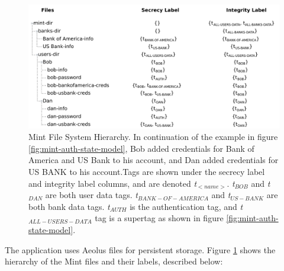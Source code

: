 \begin{figure}[h]
\centering
\includegraphics[width=\textwidth,height=\textheight,keepaspectratio]{figures/mint-filesystem}
\caption[Mint File System Hierarchy]{Mint File System Hierarchy. In continuation of the example in figure \ref{fig:mint-auth-state-model}, Bob added credentials for Bank of America and US Bank to his account, and Dan added credentials for US BANK to his account.Tags are shown under the secrecy label and integrity label columns, and are denoted \emph{t$_{<name>}$}. \emph{t$_{BOB}$} and \emph{t$_{DAN}$} are both user data tags. \emph{t$_{BANK-OF-AMERICA}$} and \emph{t$_{US-BANK}$} are both bank data tags. \emph{t$_{AUTH}$} is the authentication tag, and \emph{t$_{ALL-USERS-DATA}$} tag is a supertag as shown in figure \ref{fig:mint-auth-state-model}.}
\label{fig:mint-fs}
\end{figure}

The application uses Aeolus files for persistent storage. Figure \ref{fig:mint-fs} shows the hierarchy of the Mint files and their labels, described below:

